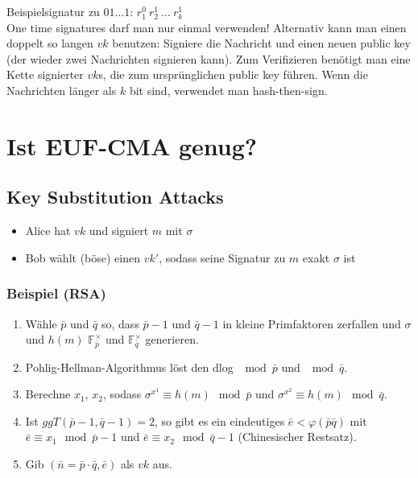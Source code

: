 \documentclass[a4paper,twoside,DIV15,BCOR12mm]{scrbook}
\begin{document}
Beispielsignatur zu $01\ldots1$: $r_1^0\ r_2^1\ \ldots\ r_k^1$\\

One time signatures darf man nur einmal verwenden! Alternativ kann man einen doppelt so langen $vk$ benutzen: Signiere die Nachricht und einen neuen public key (der wieder zwei Nachrichten signieren kann). Zum Verifizieren benötigt man eine Kette signierter $vk$s, die zum ursprünglichen public key führen. Wenn die Nachrichten länger als $k$ bit sind, verwendet man hash-then-sign.

\section{Ist EUF-CMA genug?}

\subsection{Key Substitution Attacks}

\begin{itemize}
	\item Alice hat $vk$ und signiert $m$ mit $\sigma$
	\item Bob wählt (böse) einen $vk'$, sodass seine Signatur zu $m$ exakt $\sigma$ ist
\end{itemize}

\subsubsection{Beispiel (RSA)}

\begin{enumerate}
	\item Wähle $\bar p$ und $\bar q$ so, dass $\bar p -1$ und $\bar q - 1$ in kleine Primfaktoren zerfallen und $\sigma$ und $h(m)$ $\mathbb{F}_{\bar p}^\times$ und $\mathbb{F}_{\bar q}^\times$ generieren.
	\item Pohlig-Hellman-Algorithmus löst den dlog $\mod{\bar p}$ und $\mod{\bar q}$.
	\item Berechne $x_1$, $x_2$, sodass $\sigma^{x^1} \equiv h(m) \mod{\bar p}$ und $\sigma^{x^2} \equiv h(m) \mod{\bar q}$.
	\item Ist $ggT(\bar p -1, \bar q - 1) = 2$, so gibt es ein eindeutiges $\bar e < \varphi(\bar p \bar q)$ mit $\bar e \equiv x_1 \mod{\bar p - 1}$ und $\bar e \equiv x_2 \mod{\bar q - 1}$ (Chinesischer Restsatz).
	\item Gib $(\bar n = \bar p \cdot \bar q, \bar e)$ als $vk$ aus.
\end{enumerate}
\end{document}
